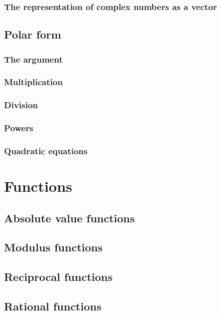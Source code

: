 \documentclass{book}
\begin{document}
\subsection{The representation of complex numbers as a vector}

\section{Polar form}

\subsection{The argument}

\subsection{Multiplication}

\subsection{Division}

\subsection{Powers}

\subsection{Quadratic equations}

\chapter{Functions}
\section{Absolute value functions}

\section{Modulus functions}

\section{Reciprocal functions}

\section{Rational functions}
\end{document}
